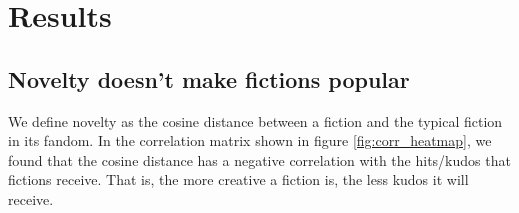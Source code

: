 \documentclass[a4paper]{article}
\begin{document}









\section{Results} %
\label{sec:results}
\subsection{Novelty doesn't make fictions popular}
We define novelty as the cosine distance between a fiction and the typical fiction in its fandom. In the correlation matrix shown in figure \ref{fig:corr_heatmap}, we found that the cosine distance has a negative correlation with the hits/kudos that fictions receive. That is, the more creative a fiction is, the less kudos it will receive.
\end{document}
